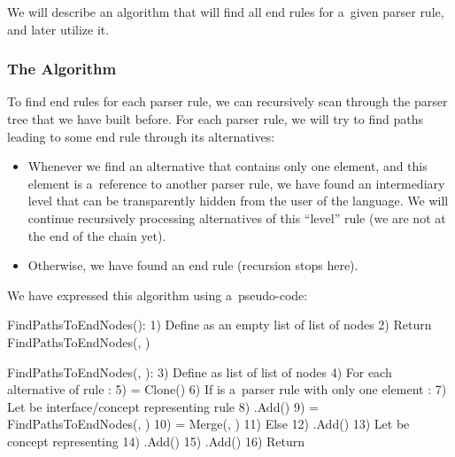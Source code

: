 We will describe an algorithm that will find all end rules for a~given parser rule, and later utilize it.

\subsubsection{The Algorithm}
To find end rules for each parser rule, we can recursively scan through the parser tree that we have built before.
For each parser rule, we will try to find paths leading to some end rule through its alternatives:

\begin{itemize}
	\item Whenever we find an alternative that contains only one element, and this element is a~reference to another parser rule, we have found an intermediary level that can be transparently hidden from the user of the language.
	We will continue recursively processing alternatives of this “level” rule (we are not at the end of the chain yet).

	\item Otherwise, we have found an end rule (recursion stops here).
\end{itemize}

We have expressed this algorithm using a~pseudo-code:

\label{chap:shortcut_algorithm}
\begin{antlr}
	FindPathsToEndNodes():
	1)  Define  as an empty list of list of nodes
	2)  Return FindPathsToEndNodes(, )

	FindPathsToEndNodes(, ):
	3)  Define  as list of list of nodes
	4)  For each alternative  of rule :
	5)       = Clone()
	6)      If  is a~parser rule with only one element :
	7)          Let  be interface/concept representing rule 
	8)          .Add()
	9)           = FindPathsToEndNodes(, )
	10)          = Merge(, )
	11)     Else
	12)         .Add()
	13)         Let  be concept representing 
	14)         .Add()
	15)         .Add()
	16) Return 
\end{antlr}

